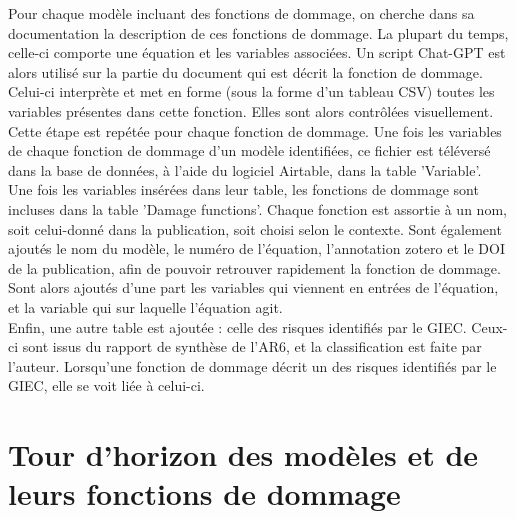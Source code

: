 \begin{methodbox}
Pour chaque modèle incluant des fonctions de dommage, on cherche dans sa documentation la description de ces fonctions de dommage. La plupart du temps, celle-ci comporte une équation et les variables associées. Un script Chat-GPT est alors utilisé sur la partie du document qui est décrit la fonction de dommage. Celui-ci interprète et met en forme (sous la forme d'un tableau CSV) toutes les variables présentes dans cette fonction. Elles sont alors contrôlées visuellement. Cette étape est repétée pour chaque fonction de dommage. Une fois les variables de chaque fonction de dommage d'un modèle identifiées, ce fichier est téléversé dans la base de données, à l'aide du logiciel Airtable, dans la table 'Variable'. \\

Une fois les variables insérées dans leur table, les fonctions de dommage sont incluses dans la table 'Damage functions'. Chaque fonction est assortie à un nom, soit celui-donné dans la publication, soit choisi selon le contexte. Sont également ajoutés le nom du modèle, le numéro de l'équation, l'annotation zotero et le DOI de la publication, afin de pouvoir retrouver rapidement la fonction de dommage. Sont alors ajoutés d'une part les variables qui viennent en entrées de l'équation, et la variable qui sur laquelle l'équation agit. \\

Enfin, une autre table est ajoutée : celle des risques identifiés par le GIEC. Ceux-ci sont issus du rapport de synthèse de l'AR6, et la classification est faite par l'auteur. Lorsqu'une fonction de dommage décrit un des risques identifiés par le GIEC, elle se voit liée à celui-ci. 



\end{methodbox}

\begin{figure}
    \centering
    \label{fig:méthodo-litrev}
\end{figure}

\section{Tour d'horizon des modèles et de leurs fonctions de dommage}

